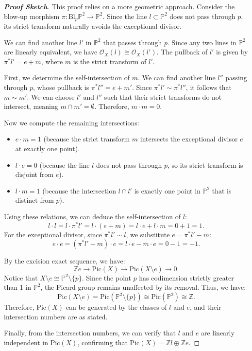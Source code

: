 \begin{proof}[\textbf{Proof Sketch}]
This proof relies on a more geometric approach. Consider the blow-up morphism $\pi: \text{Bl}_p \mathbb{P}^2 \to \mathbb{P}^2$. Since the line $l \subset \mathbb{P}^2$ does not pass through $p$, its strict transform naturally avoids the exceptional divisor. 

We can find another line $l'$ in $\mathbb{P}^2$ that passes through $p$. Since any two lines in $\mathbb{P}^2$ are linearly equivalent, we have $\mathcal{O}_X(l) \cong \mathcal{O}_X(l')$. The pullback of $l'$ is given by $\pi^* l' = e + m$, where $m$ is the strict transform of $l'$.

First, we determine the self-intersection of $m$. We can find another line $l''$ passing through $p$, whose pullback is $\pi^* l'' = e + m'$. Since $\pi^* l' \sim \pi^* l''$, it follows that $m \sim m'$. We can choose $l'$ and $l''$ such that their strict transforms do not intersect, meaning $m \cap m' = \emptyset$. Therefore, $m \cdot m = 0$.

Now we compute the remaining intersections:
\begin{itemize}
    \item $e \cdot m = 1$ (because the strict transform $m$ intersects the exceptional divisor $e$ at exactly one point).
    \item $l \cdot e = 0$ (because the line $l$ does not pass through $p$, so its strict transform is disjoint from $e$).
    \item $l \cdot m = 1$ (because the intersection $l \cap l'$ is exactly one point in $\mathbb{P}^2$ that is distinct from $p$).
\end{itemize}

Using these relations, we can deduce the self-intersection of $l$:
\[
l \cdot l = l \cdot \pi^* l' = l \cdot (e + m) = l \cdot e + l \cdot m = 0 + 1 = 1.
\]
For the exceptional divisor, since $\pi^* l' \sim l$, we substitute $e = \pi^* l' - m$:
\[
e \cdot e = (\pi^* l' - m) \cdot e = l \cdot e - m \cdot e = 0 - 1 = -1.
\]

By the excision exact sequence, we have:
\[
\mathbb{Z}e \longrightarrow \text{Pic}(X) \longrightarrow \text{Pic}(X \setminus e) \longrightarrow 0.
\]
Notice that $X \setminus e \cong \mathbb{P}^2 \setminus \{p\}$. Since the point $p$ has codimension strictly greater than 1 in $\mathbb{P}^2$, the Picard group remains unaffected by its removal. Thus, we have:
\[
\text{Pic}(X \setminus e) = \text{Pic}(\mathbb{P}^2 \setminus \{p\}) \cong \text{Pic}(\mathbb{P}^2) \cong \mathbb{Z}.
\]
Therefore, $\text{Pic}(X)$ can be generated by the classes of $l$ and $e$, and their intersection numbers are as stated.

Finally, from the intersection numbers, we can verify that $l$ and $e$ are linearly independent in $\text{Pic}(X)$, confirming that $\text{Pic}(X) = \mathbb{Z} l \oplus \mathbb{Z} e$.
\end{proof}

